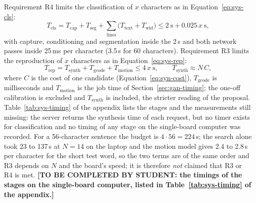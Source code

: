 Requirement R4 limits the classification of $x$ characters as in Equation~\ref{eq:sys-cls}:
\begin{equation}
T_{\mathrm{cls}}=T_{\mathrm{cap}}+T_{\mathrm{seg}}+\sum_{\mathrm{lines}}\bigl(T_{\mathrm{text}}+T_{\mathrm{wid}}\bigr)\le2\ \mathrm{s}+0.025\,x\ \mathrm{s},
\label{eq:sys-cls}
\end{equation}
with capture, conditioning and segmentation inside the 2\,s and both network passes inside 25\,ms per character (3.5\,s for 60 characters).
Requirement R3 limits the reproduction of $x$ characters as in Equation~\ref{eq:sys-rep}:
\begin{equation}
T_{\mathrm{rep}}=T_{\mathrm{synth}}+T_{\mathrm{gcode}}+T_{\mathrm{motion}}\le4\,x\ \mathrm{s},\qquad T_{\mathrm{synth}}\approx N\,C,
\label{eq:sys-rep}
\end{equation}
where $C$ is the cost of one candidate (Equation~\ref{eq:syn-cost}), $T_{\mathrm{gcode}}$ is milliseconds and $T_{\mathrm{motion}}$ is the job time of Section~\ref{sec:gan-timing}; the one-off calibration is excluded and $T_{\mathrm{synth}}$ is included, the stricter reading of the proposal.
Table~\ref{tab:sys-timing} of the appendix lists the stages and the measurements still missing: the server returns the synthesis time of each request, but no timer exists for classification and no timing of any stage on the single-board computer was recorded.
For a 56-character sentence the budget is $4\cdot56=224$\,s; the search alone took 23 to 137\,s at $N=14$ on the laptop and the motion model gives 2.4 to 2.8\,s per character for the short test word, so the two terms are of the same order and R3 depends on $N$ and the board's speed; it is therefore \emph{not} claimed that R3 or R4 is met.
\textbf{[TO BE COMPLETED BY STUDENT: the timings of the stages on the single-board computer, listed in Table~\ref{tab:sys-timing} of the appendix.]}
